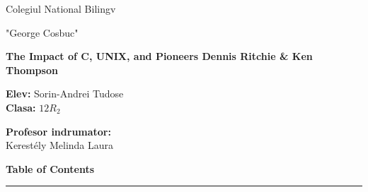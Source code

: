 \documentclass[12pt]{article}
\begin{document}
\thispagestyle{empty}   %
\begin{center}
    \vspace*{\fill}     %

    \huge Colegiul National Bilingv

    \huge "George Cosbuc"

    \vspace{4cm}

    \textbf{\Huge The Impact of C, UNIX, and Pioneers Dennis Ritchie \& Ken Thompson}

    \vspace{10cm}

    \begin{minipage}[t]{0.5\textwidth}
        \Large \textbf{Elev:}
        \large Sorin-Andrei Tudose \\
        \Large \textbf{Clasa:}
        \Large $12R_2$
    \end{minipage}%
    \begin{minipage}[t]{0.5\textwidth}
        \raggedleft
        \Large \textbf{Profesor indrumator:} \\
        \large Kerestély Melinda Laura
    \end{minipage}

    \vspace*{\fill}     %
\end{center}

\newpage
\begin{center}
    \vspace*{\fill}     %
    \Huge\textbf{Table of Contents}
    \par\noindent\rule{\textwidth}{0.4pt}
    \small\tableofcontents
    \vspace*{\fill}     %
\end{center}

\newpage
\end{document}
